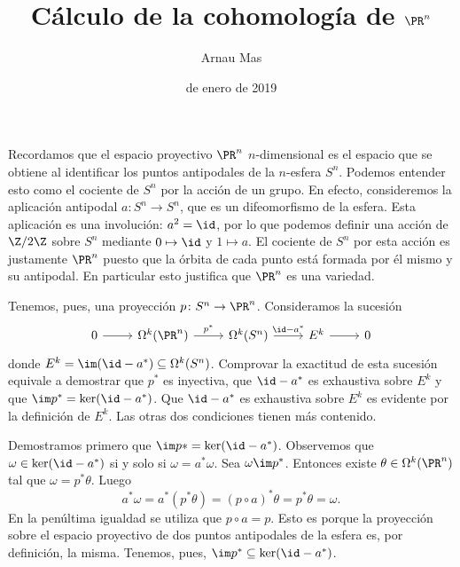 \documentclass[12pt]{article}
\title{\sffamily {\bfseries Seminario 3:} Cálculo de la cohomología de \( \PR^n \)}
\author{\sffamily Arnau Mas}
\date{\sffamily 10 de enero de 2019}
\begin{document}
\maketitle

Recordamos que el espacio proyectivo \( \PR^n \) \( n \)-dimensional es el espacio que se
obtiene al identificar los puntos antipodales de la \( n \)-esfera \( S^n \). Podemos
entender esto como el cociente de \( S^n \) por la acción de un grupo. En efecto,
consideremos la aplicación antipodal \( a \colon S^n \to S^n \), que es un difeomorfismo
de la esfera. Esta aplicación es una involución: \( a^2 = \id \), por lo que podemos
definir una acción de \( \Z/2\Z \) sobre \( S^n \) mediante \( 0 \mapsto \id \) y \( 1
\mapsto a \). El cociente de \( S^n \) por esta acción es justamente \( \PR^n \) puesto
que la órbita de cada punto está formada por él mismo y su antipodal. En particular esto
justifica que \( \PR^n \) es una variedad. 

\parbreak

Tenemos, pues, una proyección \( p \colon S^n \to \PR^n \). Consideramos la sucesión
\begin{equation}\label{eq:sucesion exacta corta}
	\begin{tikzcd}
		0 \arrow[r] & \Omega^k(\PR^n) \arrow[r, "p^\ast"] & \Omega^k(S^n) \arrow[r, "\id -
		a^\ast"] & E^k \arrow[r] & 0
	\end{tikzcd}
\end{equation}
donde \( E^k = \im(\id - a^\ast) \subseteq \Omega^k(S^n) \). Comprovar la exactitud de
esta sucesión equivale a demostrar que \( p^\ast \) es inyectiva, que \( \id - a^\ast \)
es exhaustiva sobre \( E^k \) y que \( \im p^\ast = \ker(\id - a^\ast) \). Que \( \id -
a^\ast \) es exhaustiva sobre \( E^k \) es evidente por la definición de \( E^k \). Las
otras dos condiciones tienen más contenido.

Demostramos primero que \( \im p\ast = \ker(\id - a^\ast) \). Observemos que \( \omega \in
\ker(\id - a^\ast) \) si y solo si \( \omega = a^\ast \omega \). Sea \( \omega \im p^\ast
\). Entonces existe \( \theta \in \Omega^k(\PR^n) \) tal que \( \omega = p^\ast \theta \).
Luego
\begin{equation*}
	a^\ast \omega = a^\ast (p^\ast \theta) = (p \circ a)^\ast \theta = p^\ast \theta =
	\omega.
\end{equation*}
En la penúltima igualdad se utiliza que \( p \circ a = p \). Esto es porque la proyección
sobre el espacio proyectivo de dos puntos antipodales de la esfera es, por definición, la
misma. Tenemos, pues, \( \im p^\ast \subseteq \ker(\id - a^\ast) \).
\end{document}
